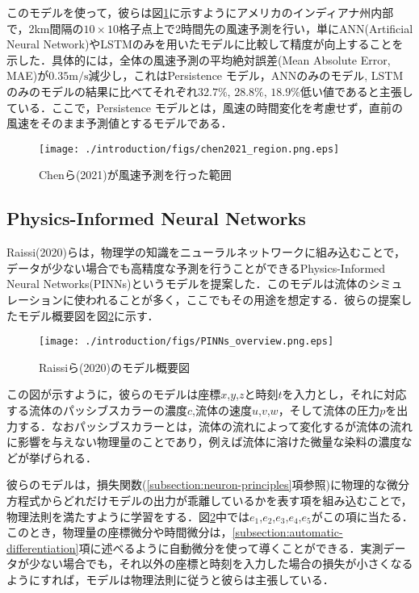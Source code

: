 このモデルを使って，彼らは図\ref{fig:chen2021_region}に示すようにアメリカのインディアナ州内部で，2km間隔の$10 \times 10$格子点上で2時間先の風速予測を行い，単にANN(Artificial Neural Network)\cite{485891}やLSTMのみを用いたモデルに比較して精度が向上することを示した．具体的には，全体の風速予測の平均絶対誤差(Mean Absolute Error, MAE)が$0.35 \mathrm{m/s}$減少し，これはPersistence モデル，ANNのみのモデル, LSTMのみのモデルの結果に比べてそれぞれ$32.7\%$, $28.8\%$, $18.9\%$低い値であると主張している．ここで，Persistence モデルとは，風速の時間変化を考慮せず，直前の風速をそのまま予測値とするモデルである．
\begin{figure}[bp]
    \centering
    \texttt{[image: ./introduction/figs/chen2021\_region.png.eps]}
    \caption{Chenら(2021)が風速予測を行った範囲\cite{CHEN2021114451}}
    \label{fig:chen2021_region}
\end{figure}

\subsection{Physics-Informed Neural Networks \label{subsec:pinns}}
Raissi(2020)らは，物理学の知識をニューラルネットワークに組み込むことで，データが少ない場合でも高精度な予測を行うことができるPhysics-Informed Neural Networks(PINNs)というモデルを提案した\cite{PINNs2020}．このモデルは流体のシミュレーションに使われることが多く\cite{app13126892}，ここでもその用途を想定する．彼らの提案したモデル概要図を図\ref{fig:pinns-overview}に示す．
\begin{figure}[bp]
    \centering
    \texttt{[image: ./introduction/figs/PINNs\_overview.png.eps]}
    \caption{Raissiら(2020)のモデル概要図\cite{PINNs2020}}
    \label{fig:pinns-overview}
\end{figure}
この図が示すように，彼らのモデルは座標$x$,$y$,$z$と時刻$t$を入力とし，それに対応する流体のパッシブスカラーの濃度$c$,流体の速度$u$,$v$,$w$，そして流体の圧力$p$を出力する．なおパッシブスカラーとは，流体の流れによって変化するが流体の流れに影響を与えない物理量のことであり，例えば流体に溶けた微量な染料の濃度などが挙げられる\cite{Lesieur1990}．

彼らのモデルは，損失関数(\ref{subsection:neuron-principles}項参照)に物理的な微分方程式からどれだけモデルの出力が乖離しているかを表す項を組み込むことで，物理法則を満たすように学習をする．図\ref{fig:pinns-overview}中では$e_1$,$e_2$,$e_3$,$e_4$,$e_5$がこの項に当たる．このとき，物理量の座標微分や時間微分は，\ref{subsection:automatic-differentiation}項に述べるように自動微分を使って導くことができる．実測データが少ない場合でも，それ以外の座標と時刻を入力した場合の損失が小さくなるようにすれば，モデルは物理法則に従うと彼らは主張している．

